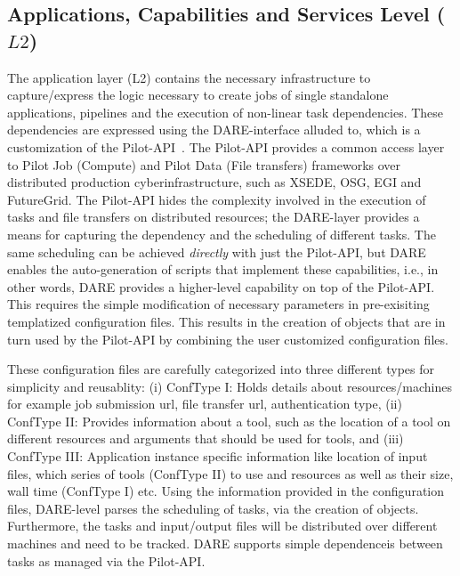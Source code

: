 \documentclass[]{svjour3}
\begin{document}



\subsection{Applications, Capabilities and Services Level ($L2$)}

The application layer (L2) contains the necessary infrastructure to
capture/express the logic necessary to create jobs of single
standalone applications, pipelines and the execution of non-linear
task dependencies.  These dependencies are expressed using the
DARE-interface alluded to, which is a customization of the
Pilot-API~\cite{pstar12}. The Pilot-API provides a common access layer
to Pilot Job (Compute) and Pilot Data (File transfers) frameworks over
distributed production cyberinfrastructure, such as XSEDE, OSG, EGI
and FutureGrid. The Pilot-API hides the complexity involved in the
execution of tasks and file transfers on distributed resources; the
DARE-layer provides a means for capturing the dependency and the
scheduling of different tasks.  The same scheduling can be achieved
{\it directly} with just the Pilot-API, but DARE enables the
auto-generation of scripts that implement these capabilities, i.e., in
other words, DARE provides a higher-level capability on top of the
Pilot-API.  This requires the simple modification of necessary
parameters in pre-exisiting templatized configuration files.  This
results in the creation of objects that are in turn used by the
Pilot-API by combining the user customized configuration files.

These configuration files are carefully categorized into three
different types for simplicity and reusablity: (i) ConfType I: Holds
details about resources/machines for example job submission url, file
transfer url, authentication type, (ii) ConfType II: Provides
information about a tool, such as the location of a tool on different
resources and arguments that should be used for tools, and (iii)
ConfType III: Application instance specific information like location
of input files, which series of tools (ConfType II) to use and
resources as well as their size, wall time (ConfType I) etc.  Using
the information provided in the configuration files, DARE-level parses
the scheduling of tasks, via the creation of objects.  Furthermore,
the tasks and input/output files will be distributed over different
machines and need to be tracked.  DARE supports simple dependenceis
between tasks as managed via the Pilot-API.
\end{document}
